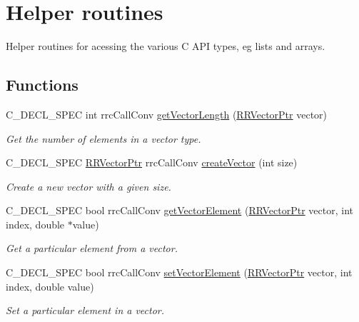 \hypertarget{group__helper_routines}{\section{Helper routines}
\label{group__helper_routines}
}


Helper routines for acessing the various C A\-P\-I types, eg lists and arrays.  


\subsection*{Functions}
\begin{DoxyCompactItemize}
\item 
C\-\_\-\-D\-E\-C\-L\-\_\-\-S\-P\-E\-C int rrc\-Call\-Conv \hyperlink{group__helper_routines_gaa54dd2d3c615bb2838c0670d0344e001}{get\-Vector\-Length} (\hyperlink{rrc__types_8h_a3be72d6006034fd349f753d2bf441bf7}{R\-R\-Vector\-Ptr} vector)
\begin{DoxyCompactList}\small\item\em Get the number of elements in a vector type. \end{DoxyCompactList}\item 
C\-\_\-\-D\-E\-C\-L\-\_\-\-S\-P\-E\-C \hyperlink{rrc__types_8h_a3be72d6006034fd349f753d2bf441bf7}{R\-R\-Vector\-Ptr} rrc\-Call\-Conv \hyperlink{group__helper_routines_ga9f52eab51dfe4dcd3d87538bf8ecd453}{create\-Vector} (int size)
\begin{DoxyCompactList}\small\item\em Create a new vector with a given size. \end{DoxyCompactList}\item 
C\-\_\-\-D\-E\-C\-L\-\_\-\-S\-P\-E\-C bool rrc\-Call\-Conv \hyperlink{group__helper_routines_ga859e5c6b606171f6a86311de2ee36ca6}{get\-Vector\-Element} (\hyperlink{rrc__types_8h_a3be72d6006034fd349f753d2bf441bf7}{R\-R\-Vector\-Ptr} vector, int index, double $\ast$value)
\begin{DoxyCompactList}\small\item\em Get a particular element from a vector. \end{DoxyCompactList}\item 
C\-\_\-\-D\-E\-C\-L\-\_\-\-S\-P\-E\-C bool rrc\-Call\-Conv \hyperlink{group__helper_routines_ga25a6d2f359f6a8fee529bc5c7e21ad9f}{set\-Vector\-Element} (\hyperlink{rrc__types_8h_a3be72d6006034fd349f753d2bf441bf7}{R\-R\-Vector\-Ptr} vector, int index, double value)
\begin{DoxyCompactList}\small\item\em Set a particular element in a vector. \end{DoxyCompactList}\item 

\end{DoxyCompactItemize}
